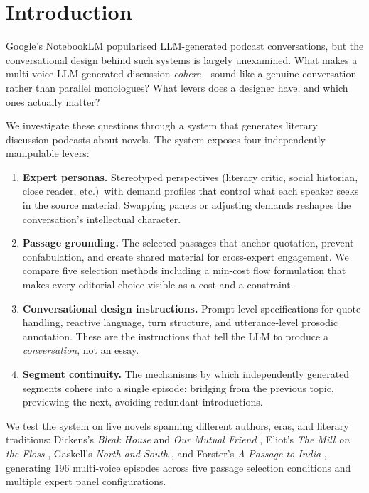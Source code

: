 \documentclass[final]{clv2025}
\begin{document}
\section{Introduction}
\label{sec:intro}

Google's NotebookLM \citep{notebooklm2024} popularised LLM-generated
podcast conversations, but the conversational design behind such
systems is largely unexamined.  What makes a multi-voice
LLM-generated discussion \emph{cohere}---sound like a genuine
conversation rather than parallel monologues?  What levers does a
designer have, and which ones actually matter?

We investigate these questions through a system that generates literary
discussion podcasts about novels.  The system exposes four
independently manipulable levers:

\begin{enumerate}
\item \textbf{Expert personas.}  Stereotyped perspectives (literary
  critic, social historian, close reader, etc.)\ with demand profiles
  that control what each speaker seeks in the source material.
  Swapping panels or adjusting demands reshapes the conversation's
  intellectual character.
\item \textbf{Passage grounding.}  The selected passages that anchor
  quotation, prevent confabulation, and create shared material for
  cross-expert engagement.  We compare five selection methods including
  a min-cost flow formulation that makes every editorial choice visible
  as a cost and a constraint.
\item \textbf{Conversational design instructions.}  Prompt-level
  specifications for quote handling, reactive language, turn structure,
  and utterance-level prosodic annotation.  These are the instructions
  that tell the LLM to produce a \emph{conversation}, not an essay.
\item \textbf{Segment continuity.}  The mechanisms by which
  independently generated segments cohere into a single episode:
  bridging from the previous topic, previewing the next, avoiding
  redundant introductions.
\end{enumerate}

We test the system on five novels spanning different authors, eras, and
literary traditions: Dickens's \textit{Bleak House}
\citep{dickens1853bleak} and \textit{Our Mutual Friend}
\citep{dickens1865omf}, Eliot's \textit{The Mill on the Floss}
\citep{eliot1860mill}, Gaskell's \textit{North and South}
\citep{gaskell1855north}, and Forster's \textit{A Passage to India}
\citep{forster1924passage}, generating 196 multi-voice episodes across
five passage selection conditions and multiple expert panel
configurations.
\end{document}
